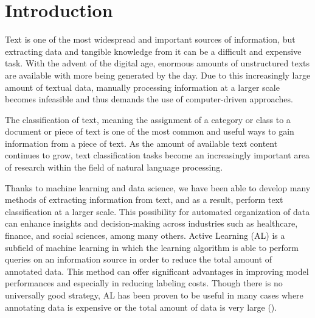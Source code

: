 \documentclass[english,bachelor,ul]{webisthesis} %
\begin{document}
\begin{frontmatter}
\begin{abstract}
This is the \LaTeX{} template for Bachelor and Master theses at Webis. This template contains several hints and conventions on how to structure a thesis, how to cite the work of others, and how to display your results besides plain text. 
\end{abstract}
\end{frontmatter}

\tableofcontents

\chapter{Introduction}

Text is one of the most widespread and important sources of information, but extracting data and tangible knowledge from it can be a difficult and expensive task. With the advent of the digital age, enormous amounts of unstructured texts are available with more being generated by the day. Due to this increasingly large amount of textual data, manually processing information at a larger scale becomes infeasible and thus demands the use of computer-driven approaches. 

The classification of text, meaning the assignment of a category or class to a document or piece of text is one of the most common and useful ways to gain information from a piece of text. As the amount of available text content continues to grow, text classification tasks become an increasingly important area of research within the field of natural language processing. 

Thanks to machine learning and data science, we have been able to develop many methods of extracting information from text, and as a result, perform text classification at a larger scale. This possibility for automated organization of data can enhance insights and decision-making across industries such as healthcare, finance, and social sciences, among many others. Active Learning (AL) is a subfield of machine learning in which the learning algorithm is able to perform queries on an information source in order to reduce the total amount of annotated data. This method can offer significant advantages in improving model performances and especially in reducing labeling costs. Though there is no universally good strategy, AL has been proven to be useful in many cases where annotating data is expensive or the total amount of data is very large (\cite{settles.tr09}). 
\end{document}
